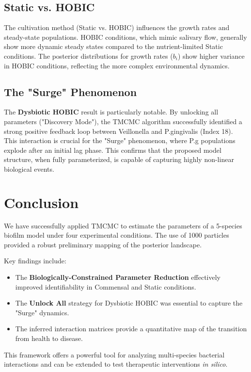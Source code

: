 \documentclass[11pt,a4paper]{article}
\begin{document}
\subsection{Static vs. HOBIC}
The cultivation method (Static vs. HOBIC) influences the growth rates and steady-state populations. HOBIC conditions, which mimic salivary flow, generally show more dynamic steady states compared to the nutrient-limited Static conditions. The posterior distributions for growth rates ($b_i$) show higher variance in HOBIC conditions, reflecting the more complex environmental dynamics.

\subsection{The "Surge" Phenomenon}
The \textbf{Dysbiotic HOBIC} result is particularly notable. By unlocking all parameters ("Discovery Mode"), the TMCMC algorithm successfully identified a strong positive feedback loop between Veillonella and P.gingivalis (Index 18). This interaction is crucial for the "Surge" phenomenon, where P.g populations explode after an initial lag phase. This confirms that the proposed model structure, when fully parameterized, is capable of capturing highly non-linear biological events.

\section{Conclusion}

We have successfully applied TMCMC to estimate the parameters of a 5-species biofilm model under four experimental conditions. The use of 1000 particles provided a robust preliminary mapping of the posterior landscape.

Key findings include:
\begin{itemize}
    \item The \textbf{Biologically-Constrained Parameter Reduction} effectively improved identifiability in Commensal and Static conditions.
    \item The \textbf{Unlock All} strategy for Dysbiotic HOBIC was essential to capture the "Surge" dynamics.
    \item The inferred interaction matrices provide a quantitative map of the transition from health to disease.
\end{itemize}

This framework offers a powerful tool for analyzing multi-species bacterial interactions and can be extended to test therapeutic interventions \textit{in silico}.
\end{document}
